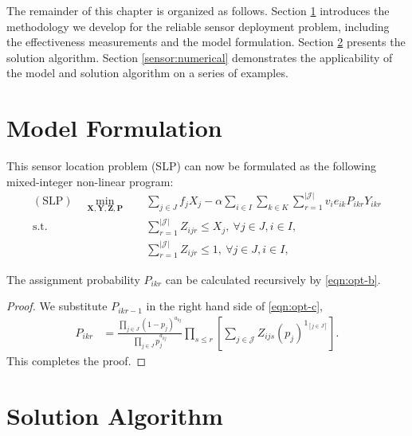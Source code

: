 The remainder of this chapter is organized as follows. Section \ref{sensor:formulation} introduces the methodology we develop for the reliable sensor deployment problem, including the effectiveness measurements and the model formulation. Section \ref{sensor:algorithm} presents the solution algorithm. Section \ref{sensor:numerical} demonstrates the applicability of the model and solution algorithm on a series of examples.



\section{Model Formulation}\label{sensor:formulation}

This sensor location problem (SLP) can now be formulated as the following mixed-integer non-linear program:
\begin{subequations}
  \begin{align}
    (\text{SLP}) \quad \min_{\mathbf{X,Y,Z,P}} & \quad \sum_{j\in J} f_{j}X_{j} - \alpha\sum_{i\in I}\sum_{k\in K}\sum_{r=1}^{|\mathcal{J}|} v_{i}e_{ik}P_{ikr}Y_{ikr} \label{eqn:opt-a} \\
   \text{s.t.} & \quad \sum_{r=1}^{|\mathcal{J}|} Z_{ijr}\le X_{j}, ~\forall j\in J, i\in I, \label{eqn:opt-b} \\
   & \quad \sum_{r=1}^{|\mathcal{J}|} Z_{ijr}\le 1, ~\forall j\in J, i\in I, \label{eqn:opt-c}
  \end{align}
\end{subequations}


\begin{prop} 
  \label{prop:1}
    The assignment probability $P_{ikr}$ can be calculated recursively by \eqref{eqn:opt-b}.
\end{prop} 

\begin{proof}
  We substitute $P_{ikr-1}$ in the right hand side of \eqref{eqn:opt-c},
  \begin{align}
     P_{ikr} &= \frac{\prod_{j\in J}\left(1-p_{j}\right)^{a_{kj}}}{\prod_{j\in J}p_{j}^{a_{kj}}}\prod_{s\le r}\left[ \sum_{j\in \mathcal{J}} Z_{ijs}\left(p_{j}\right)^{1_{[j\in J]}} \right]. \label{eqn:2}
  \end{align}
  This completes the proof.
\end{proof}

\section{Solution Algorithm}\label{sensor:algorithm}
